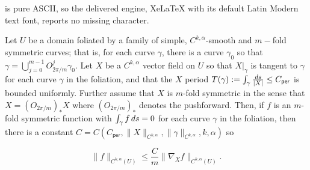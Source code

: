 \documentclass[10pt,a4paper]{amsart}
\newcommand{\rmd}{{\rm d}}
\begin{document}
is pure ASCII, so the delivered engine, XeLaTeX with its default Latin Modern text font, reports no missing character.
\begin{lemma}
  \label{Xpoin}
  Let $U$ be a domain foliated by a family of simple, $C^{k,\alpha}$-smooth
  and $m-$fold symmetric curves; that is, for each curve
  $\gamma$, there is a curve $\gamma_0$ so that
  $\gamma = \bigcup_{j=0}^{m-1}  O_{2\pi/m}^j\gamma_0$.
  Let $X$ be a $C^{k,\alpha}$ vector field on $U$ so that $X|_\gamma$ is tangent
  to $\gamma$ for each curve $\gamma$ in the foliation, and that the $X$ period $T(\gamma) := \int_\gamma \frac{\rmd s}{|X|}\leq C_{\mathsf{per}}$ is bounded uniformly.
  Further assume that $X$ is $m$-fold symmetric in the sense that $X= ({O_{2\pi/m}})_* X$
  where $({O_{2\pi/m}})_* $ denotes the pushforward.  Then, if $f$ is an $m$-fold symmetric function with $\int_{\gamma} f\, \rmd s = 0$ for each
  curve $\gamma$ in the foliation, then there is a constant
  $C = C\left(C_{\mathsf{per}},\|X\|_{C^{k,\alpha}}, \|\gamma\|_{C^{k,\alpha}},
     k, \alpha\right)$ so 

  \begin{equation}
    \label{poin}
    \| f \|_{C^{k,\alpha}(U)} \leq   \frac{C}{m} \| \nabla_X f\|_{C^{k,\alpha}(U)}.
  \end{equation}

\end{lemma}
\end{document}
